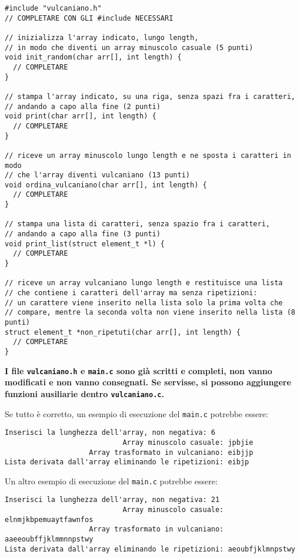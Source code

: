 \documentclass[12pt]{article}
\begin{document}
\begin{center}
  \begin{lstlisting}[language=myC]
#include "vulcaniano.h"
// COMPLETARE CON GLI #include NECESSARI

// inizializza l'array indicato, lungo length,
// in modo che diventi un array minuscolo casuale (5 punti)
void init_random(char arr[], int length) {
  // COMPLETARE
}

// stampa l'array indicato, su una riga, senza spazi fra i caratteri,
// andando a capo alla fine (2 punti)
void print(char arr[], int length) {
  // COMPLETARE
}

// riceve un array minuscolo lungo length e ne sposta i caratteri in modo
// che l'array diventi vulcaniano (13 punti)
void ordina_vulcaniano(char arr[], int length) {
  // COMPLETARE
}

// stampa una lista di caratteri, senza spazio fra i caratteri,
// andando a capo alla fine (3 punti)
void print_list(struct element_t *l) {
  // COMPLETARE
}

// riceve un array vulcaniano lungo length e restituisce una lista
// che contiene i caratteri dell'array ma senza ripetizioni:
// un carattere viene inserito nella lista solo la prima volta che
// compare, mentre la seconda volta non viene inserito nella lista (8 punti)
struct element_t *non_ripetuti(char arr[], int length) {
  // COMPLETARE
}
  \end{lstlisting}
\end{center}

\begin{mdframed}[backgroundcolor=lightred] 
  \textbf{I file \texttt{vulcaniano.h} e \texttt{main.c} sono gi\`a scritti e completi, non vanno modificati e non vanno consegnati. Se servisse, si possono aggiungere funzioni ausiliarie dentro \texttt{vulcaniano.c}.}
\end{mdframed}

\vspace*{5ex}
Se tutto \`e corretto,
un esempio di esecuzione del \texttt{main.c} potrebbe essere:

\begin{mdframed}[backgroundcolor=verylightgray] 
\begin{verbatim}
Inserisci la lunghezza dell'array, non negativa: 6
                            Array minuscolo casuale: jpbjie
                    Array trasformato in vulcaniano: eibjjp
Lista derivata dall'array eliminando le ripetizioni: eibjp
\end{verbatim}
\end{mdframed}

Un altro esempio di esecuzione del \texttt{main.c} potrebbe essere:

\begin{mdframed}[backgroundcolor=verylightgray] 
\begin{verbatim}
Inserisci la lunghezza dell'array, non negativa: 21
                            Array minuscolo casuale: elnmjkbpemuaytfawnfos
                    Array trasformato in vulcaniano: aaeeoubffjklmmnnpstwy
Lista derivata dall'array eliminando le ripetizioni: aeoubfjklmnpstwy
\end{verbatim}
\end{mdframed}
\end{document}
